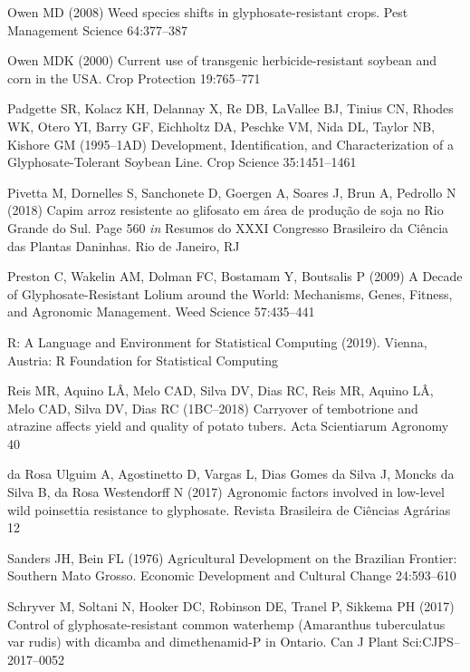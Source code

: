 \documentclass[
  12pt,
  a4paper]{article}
\begin{document}
\leavevmode\hypertarget{ref-owen_weed_2008}{}%
Owen MD (2008) Weed species shifts in glyphosate-resistant crops. Pest
Management Science 64:377--387

\leavevmode\hypertarget{ref-owen_current_2000}{}%
Owen MDK (2000) Current use of transgenic herbicide-resistant soybean
and corn in the USA. Crop Protection 19:765--771

\leavevmode\hypertarget{ref-padgette_development_1995}{}%
Padgette SR, Kolacz KH, Delannay X, Re DB, LaVallee BJ, Tinius CN,
Rhodes WK, Otero YI, Barry GF, Eichholtz DA, Peschke VM, Nida DL, Taylor
NB, Kishore GM (1995--1AD) Development, Identification, and
Characterization of a Glyphosate-Tolerant Soybean Line. Crop Science
35:1451--1461

\leavevmode\hypertarget{ref-pivetta_capim_2018}{}%
Pivetta M, Dornelles S, Sanchonete D, Goergen A, Soares J, Brun A,
Pedrollo N (2018) Capim arroz resistente ao glifosato em área de
produção de soja no Rio Grande do Sul. Page 560 \emph{in} Resumos do
XXXI Congresso Brasileiro da Ciência das Plantas Daninhas. Rio de
Janeiro, RJ

\leavevmode\hypertarget{ref-preston_decade_2009}{}%
Preston C, Wakelin AM, Dolman FC, Bostamam Y, Boutsalis P (2009) A
Decade of Glyphosate-Resistant Lolium around the World: Mechanisms,
Genes, Fitness, and Agronomic Management. Weed Science 57:435--441

\leavevmode\hypertarget{ref-r_core_team_r:_2019}{}%
R: A Language and Environment for Statistical Computing (2019). Vienna,
Austria: R Foundation for Statistical Computing

\leavevmode\hypertarget{ref-reis_carryover_2018}{}%
Reis MR, Aquino LÂ, Melo CAD, Silva DV, Dias RC, Reis MR, Aquino LÂ,
Melo CAD, Silva DV, Dias RC (1BC--2018) Carryover of tembotrione and
atrazine affects yield and quality of potato tubers. Acta Scientiarum
Agronomy 40

\leavevmode\hypertarget{ref-da_rosa_ulguim_agronomic_2017}{}%
da Rosa Ulguim A, Agostinetto D, Vargas L, Dias Gomes da Silva J, Moncks
da Silva B, da Rosa Westendorff N (2017) Agronomic factors involved in
low-level wild poinsettia resistance to glyphosate. Revista Brasileira
de Ciências Agrárias 12

\leavevmode\hypertarget{ref-sanders_agricultural_1976}{}%
Sanders JH, Bein FL (1976) Agricultural Development on the Brazilian
Frontier: Southern Mato Grosso. Economic Development and Cultural Change
24:593--610

\leavevmode\hypertarget{ref-schryver_control_2017}{}%
Schryver M, Soltani N, Hooker DC, Robinson DE, Tranel P, Sikkema PH
(2017) Control of glyphosate-resistant common waterhemp (Amaranthus
tuberculatus var rudis) with dicamba and dimethenamid-P in Ontario. Can
J Plant Sci:CJPS--2017--0052
\end{document}
